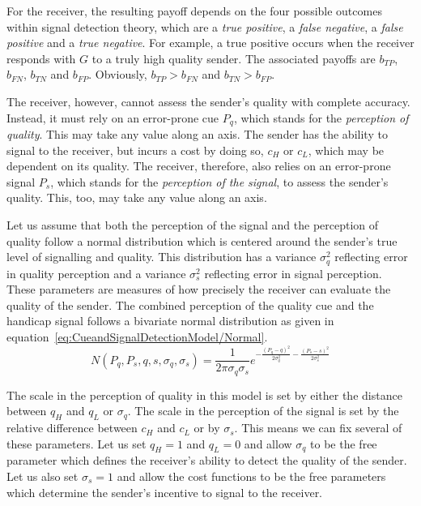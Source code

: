 \documentclass[a4paper,12pt]{article}
\numberwithin{equation}{section}
\begin{document}
For the receiver, the resulting payoff depends on the four possible outcomes within signal detection theory, which are a \textit{true positive}, a \textit{false negative}, a \textit{false positive} and a \textit{true negative}. For example, a true positive occurs when the receiver responds with $G$ to a truly high quality sender. The associated payoffs are $b_{TP}$, $b_{FN}$, $b_{TN}$ and $b_{FP}$. Obviously, $b_{TP}>b_{FN}$ and $b_{TN}>b_{FP}$.

The receiver, however, cannot assess the sender's quality with complete accuracy. Instead, it must rely on an error-prone cue $P_{q}$, which stands for the \textit{perception of quality}. This may take any value along an axis. The sender has the ability to signal to the receiver, but incurs a cost by doing so, $c_{H}$ or $c_{L}$, which may be dependent on its quality. The receiver, therefore, also relies on an error-prone signal $P_{s}$, which stands for the \textit{perception of the signal}, to assess the sender's quality. This, too, may take any value along an axis.

Let us assume that both the perception of the signal and the perception of quality follow a normal distribution which is centered around the sender's true level of signalling and quality. This distribution has a variance $\sigma^{2}_{q}$ reflecting error in quality perception and a variance $\sigma^{2}_{s}$ reflecting error in signal perception. These parameters are measures of how precisely the receiver can evaluate the quality of the sender. The combined perception of the quality cue and the handicap signal follows a bivariate normal distribution as given in equation~\ref{eq:CueandSignalDetectionModel/Normal}.
\begin{equation}
\label{eq:CueandSignalDetectionModel/Normal}
N(P_{q}, P_{s}, q, s, \sigma_{q}, \sigma_{s}) = \frac{1}{2 \pi \sigma_{q} \sigma_{s}} e^{-\frac{(P_{q}-q)^2}{2 \sigma_{q}^2}-\frac{(P_{s}-s)^2}{2 \sigma_{s}^2}}
\end{equation}

The scale in the perception of quality in this model is set by either the distance between $q_{H}$ and $q_{L}$ or $\sigma_{q}$. The scale in the perception of the signal is set by the relative difference between $c_{H}$ and $c_{L}$ or by $\sigma_{s}$. This means we can fix several of these parameters. Let us set $q_{H}=1$ and $q_{L}=0$ and allow $\sigma_{q}$ to be the free parameter which defines the receiver's ability to detect the quality of the sender. Let us also set $\sigma_{s}=1$ and allow the cost functions to be the free parameters which determine the sender's incentive to signal to the receiver.
\end{document}
